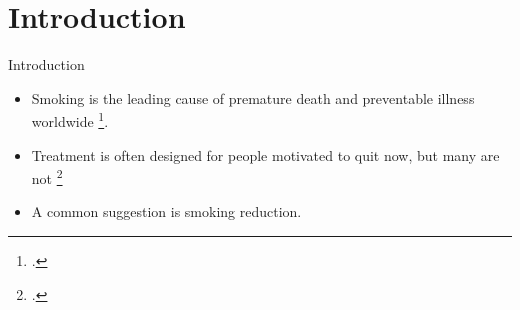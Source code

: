 \documentclass[aspectratio=169]{beamer}
\begin{document}
\section{Introduction}

\begin{frame}{Introduction}
	\begin{itemize}

		\item Smoking is the leading cause of premature death and preventable illness worldwide \footcite{worldhealthorganizationWHOReportGlobal2011}.
		\pause
		\item Treatment is often designed for people motivated to quit now, but many are not \footcite{ReidEtAl2019, WewersEtAl2003}
		\pause
		\item A common suggestion is smoking reduction.

	\end{itemize}
\end{frame}
\end{document}
